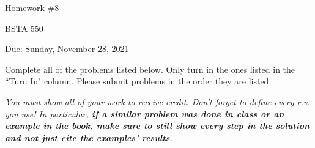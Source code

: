 \documentclass[12pt]{article}
\begin{document}
\begin{center}

Homework \#8

BSTA 550

Due: Sunday, November 28, 2021 

%

%
\bigskip



\end{center}


\bigskip

Complete all of the problems listed below. \newline 
Only turn in the ones listed in the ``Turn In" column. \newline
Please submit problems in the order they are listed.

\bigskip

\textit{You must show all of your work to receive credit. Don't forget to define every r.v. you use!}  \newline 
\textit{In particular, \textbf{if a similar problem was done in class or an example in the book, make sure to still show every step in the solution and not just cite the examples' results}.}  \newline 



\end{document}
